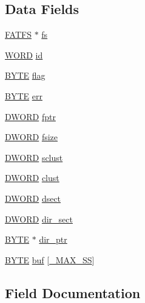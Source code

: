 \subsection*{Data Fields}
\begin{DoxyCompactItemize}
\item 
\hyperlink{structFATFS}{F\+A\+T\+FS} $\ast$ \hyperlink{structFIL_a42376a6797a06228911c8b836c1e9030}{fs}
\item 
\hyperlink{integer_8h_a197942eefa7db30960ae396d68339b97}{W\+O\+RD} \hyperlink{structFIL_af7cae0063b0045fb7078b560101ba8f2}{id}
\item 
\hyperlink{integer_8h_a4ae1dab0fb4b072a66584546209e7d58}{B\+Y\+TE} \hyperlink{structFIL_ac409508881f5a16f2998ae675072b376}{flag}
\item 
\hyperlink{integer_8h_a4ae1dab0fb4b072a66584546209e7d58}{B\+Y\+TE} \hyperlink{structFIL_aea440945db26de9c4a88065c0c887fda}{err}
\item 
\hyperlink{integer_8h_ad342ac907eb044443153a22f964bf0af}{D\+W\+O\+RD} \hyperlink{structFIL_a75d29cf9257c827d117887b9f924c4a9}{fptr}
\item 
\hyperlink{integer_8h_ad342ac907eb044443153a22f964bf0af}{D\+W\+O\+RD} \hyperlink{structFIL_aa00790d40d7b0081c345fd4f76e22b70}{fsize}
\item 
\hyperlink{integer_8h_ad342ac907eb044443153a22f964bf0af}{D\+W\+O\+RD} \hyperlink{structFIL_ad308b74c8d6975c6a9c30d90b4124c40}{sclust}
\item 
\hyperlink{integer_8h_ad342ac907eb044443153a22f964bf0af}{D\+W\+O\+RD} \hyperlink{structFIL_aa41312aba551b9a6d1c9d3c8c7d2734b}{clust}
\item 
\hyperlink{integer_8h_ad342ac907eb044443153a22f964bf0af}{D\+W\+O\+RD} \hyperlink{structFIL_ab3d4165d6fd32ac71a130d835fbf0b4d}{dsect}
\item 
\hyperlink{integer_8h_ad342ac907eb044443153a22f964bf0af}{D\+W\+O\+RD} \hyperlink{structFIL_ab203794f939ad4480e81dfa488770783}{dir\+\_\+sect}
\item 
\hyperlink{integer_8h_a4ae1dab0fb4b072a66584546209e7d58}{B\+Y\+TE} $\ast$ \hyperlink{structFIL_a5af9e9fb312b629220eaf684dd28c4a9}{dir\+\_\+ptr}
\item 
\hyperlink{integer_8h_a4ae1dab0fb4b072a66584546209e7d58}{B\+Y\+TE} \hyperlink{structFIL_a7a95fb86588663e48309b5cded7e207b}{buf} \mbox{[}\hyperlink{ffconf_8h_ac271b697378912f17132cb9c7d0de024}{\+\_\+\+M\+A\+X\+\_\+\+SS}\mbox{]}
\end{DoxyCompactItemize}


\subsection{Field Documentation}
